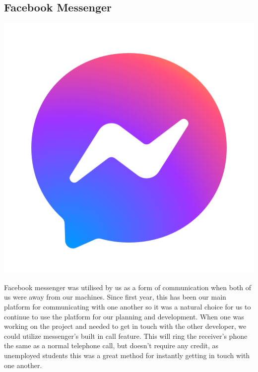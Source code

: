 \subsection{Facebook Messenger}
\includegraphics[scale=0.3]{img/messenger.png} \par
Facebook messenger was utilised by us as a form of communication when both of us were away from our machines. Since first year, this has been our main platform for communicating with one another so it was a natural choice for us to continue to use the platform for our planning and development. When one was working on the project and needed to get in touch with the other developer, we could utilize messenger's built in call feature. This will ring the receiver's phone the same as a normal telephone call, but doesn't require any credit, as unemployed students this was a great method for instantly getting in touch with one another.

